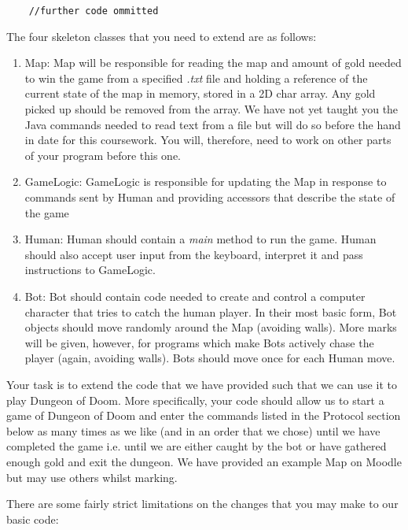 \documentclass{article}
\begin{document}
{\begin{lstlisting}
    //further code ommitted
\end{lstlisting}

The four skeleton classes that you need to extend are as follows:
\begin{enumerate}
\item{Map:} Map will be responsible for reading the map and amount of gold needed to win the game from a specified \textit{.txt} file and holding a reference of the current state of the map in memory, stored in a 2D char array. Any gold picked up should be removed from the array. We have not yet taught you the Java commands needed to read text from a file but will do so before the hand in date for this coursework. You will, therefore, need to work on other parts of your program before this one.
\item{GameLogic:} GameLogic is responsible for updating the Map in response to commands sent by Human and providing accessors that describe the state of the game
\item{Human:} Human should contain a \textit{main} method to run the game. Human should also accept user input from the keyboard, interpret it and pass instructions to GameLogic.
\item{Bot:} Bot should contain code needed to create and control a computer character that tries to catch the human player. In their most basic form, Bot objects should move randomly around the Map (avoiding walls). More marks will be given, however, for programs which make Bots actively chase the player (again, avoiding walls). Bots should move once for each Human move.
\end{enumerate}

Your task is to extend the code that we have provided such that we can use it to play Dungeon of Doom. More specifically, your code should allow us to start a game of Dungeon of Doom and enter the commands listed in the Protocol section below as many times as we like (and in an order that we chose) until we have completed the game i.e. until we are either caught by the bot or have gathered enough gold and exit the dungeon. We have provided an example Map on Moodle but may use others whilst marking. 

There are some fairly strict limitations on the changes that you may make to our basic code:

}
\end{document}
